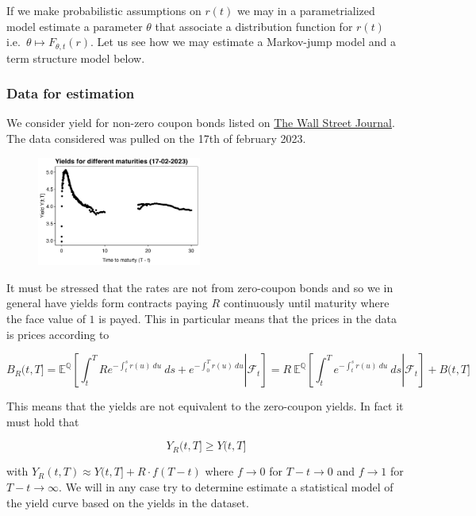 \documentclass[a4paper,12pt,openany]{book}
\begin{document}
If we make probabilistic assumptions on \(r(t)\) we may in a parametrialized model estimate a parameter \(\theta\) that associate a distribution function for \(r(t)\) i.e.~\(\theta \mapsto F_{\theta,t}(r)\). Let us see how we may estimate a Markov-jump model and a term structure model below.

\hypertarget{data-for-estimation}{%
\subsubsection{Data for estimation}\label{data-for-estimation}}

We consider yield for non-zero coupon bonds listed on \href{https://www.wsj.com/market-data/bonds/treasuries?mod=md_bond_view_treasury_quotes}{The Wall Street Journal}. The data considered was pulled on the 17th of february 2023.

\begin{figure}[H]
  \begin{center}
    \includegraphics[width=0.48\textwidth]{figures/ph_est_data.png}
  \end{center}
\end{figure}

It must be stressed that the rates are not from zero-coupon bonds and so we in general have yields form contracts paying \(R\) continuously until maturity where the face value of \(1\) is payed. This in particular means that the prices in the data is prices according to

\[
B_R(t,T]=\mathbb E^{\mathbb Q}\left[\left.\int_t^T Re^{-\int_t^s r(u)\ du}\ ds+e^{-\int_0^T r(u)\ du} \right\vert\mathcal F_t\right]=R\ \mathbb  E^{\mathbb Q}\left[\left.\int_t^T e^{-\int_t^s r(u)\ du}\ ds \right\vert\mathcal F_t\right]+ B(t,T]
\]

This means that the yields are not equivalent to the zero-coupon yields. In fact it must hold that

\[
Y_R(t,T]\ge Y(t,T]
\]

with \(Y_R(t,T)\approx Y(t,T]+R\cdot f(T-t)\) where \(f\to 0\) for \(T-t\to 0\) and \(f\to 1\) for \(T-t\to \infty\). We will in any case try to determine estimate a statistical model of the yield curve based on the yields in the dataset.
\end{document}
